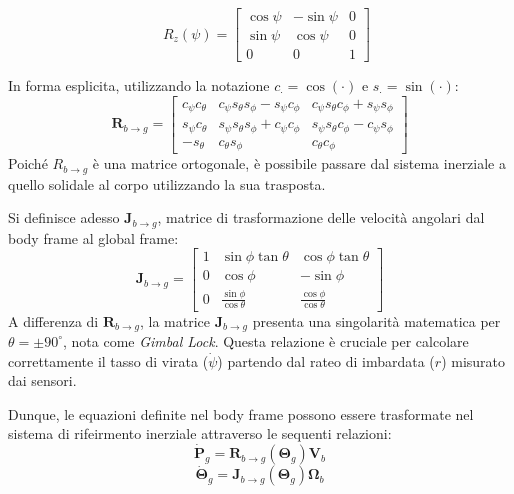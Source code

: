 		\begin{equation}\quad
			R_z(\psi) =
			\begin{bmatrix}
				\cos\psi & -\sin\psi & 0 \\
				\sin\psi & \cos\psi & 0 \\
				0 & 0 & 1
			\end{bmatrix}
		\end{equation}

In forma esplicita, utilizzando la notazione $c_{\cdot}=\cos(\cdot)$ e $s_{\cdot}=\sin(\cdot)$:
\begin{equation}
    \bm{R}_{b \to g} = 
    \begin{bmatrix}
        c_\psi c_\theta & c_\psi s_\theta s_\phi - s_\psi c_\phi & c_\psi s_\theta c_\phi + s_\psi s_\phi \\
        s_\psi c_\theta & s_\psi s_\theta s_\phi + c_\psi c_\phi & s_\psi s_\theta c_\phi - c_\psi s_\phi \\
        -s_\theta       & c_\theta s_\phi                        & c_\theta c_\phi
    \end{bmatrix}
    \label{eq:matrix_R}
\end{equation}
Poiché ${R}_{b \to g}$ è una matrice ortogonale, è possibile passare dal sistema inerziale a quello solidale al corpo utilizzando la sua trasposta.

Si definisce adesso  $\bm{J}_{b \to g}$, matrice di trasformazione delle velocità angolari dal body frame al global frame:
\begin{equation}
    \bm{J}_{b \to g} = 
    \begin{bmatrix}
        1 & \sin\phi \tan\theta & \cos\phi \tan\theta \\
        0 & \cos\phi            & -\sin\phi \\
        0 & \frac{\sin\phi}{\cos\theta} & \frac{\cos\phi}{\cos\theta}
    \end{bmatrix}
    \label{eq:matrix_J}
\end{equation}
A differenza di $\bm{R}_{b \to g}$, la matrice $\bm{J}_{b \to g}$ presenta una singolarità matematica per \hbox{$\theta = \pm 90^\circ$}, nota come \textit{Gimbal Lock}. Questa relazione è cruciale per calcolare correttamente il tasso di virata ($\dot{\psi}$) partendo dal rateo di imbardata ($r$) misurato dai sensori.

Dunque, le equazioni definite nel body frame possono essere trasformate nel sistema di rifeirmento inerziale attraverso le sequenti relazioni:
\begin{equation}
    \bm{\dot{P}}_g = \bm{R}_{b \to g}(\bm{\Theta}_g) \bm{V}_b
    \label{eq:pos_global}
\end{equation}
\begin{equation}
    \bm{\dot{\Theta}}_g = \bm{J}_{b \to g}(\bm{\Theta}_g) \bm{\Omega}_b
    \label{eq:vel_ang_global}
\end{equation}

